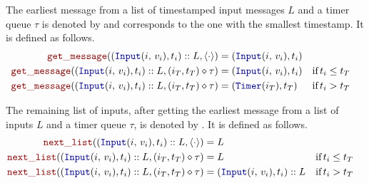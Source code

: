 \begin{definition}
    \label{def:semantics:grfrp:theorems:productivity:observe:aux:getMess}
    The earliest message from a list of timestamped input messages $L$ and a timer queue $\tau$ is
    denoted by  and corresponds to the one with the smallest timestamp. It is
    defined as follows.
    \begin{align}
        \getMess{(\inputMess{i}{v_i}, t_i) :: L}{\emptytimer}              & = (\inputMess{i}{v_i}, t_i)
        \label{eq:semantics:grfrp:theorems:productivity:observe:aux:getMess:empty}                                                     \\
        \getMess{(\inputMess{i}{v_i}, t_i) :: L}{(i_T, t_T) \diamond \tau} & = (\inputMess{i}{v_i}, t_i) &  & \text{if} \, t_i \le t_T
        \label{eq:semantics:grfrp:theorems:productivity:observe:aux:getMess:input}                                                     \\
        \getMess{(\inputMess{i}{v_i}, t_i) :: L}{(i_T, t_T) \diamond \tau} & = (\timerMess{i_T}, t_T)    &  & \text{if} \, t_i > t_T
        \label{eq:semantics:grfrp:theorems:productivity:observe:aux:getMess:timer}
    \end{align}
\end{definition}

\begin{definition}
    \label{def:semantics:grfrp:theorems:productivity:observe:aux:nextList}
    The remaining list of inputs, after getting the earliest message from a list of inputs $L$ and a
    timer queue $\tau$, is denoted by . It is defined as follows.
    \begin{align}
        \nextList{(\inputMess{i}{v_i}, t_i) :: L}{\emptytimer}              & = L
        \label{eq:semantics:grfrp:theorems:productivity:observe:aux:nextList:empty}                                                          \\
        \nextList{(\inputMess{i}{v_i}, t_i) :: L}{(i_T, t_T) \diamond \tau} & = L                              &  & \text{if} \, t_i \le t_T
        \label{eq:semantics:grfrp:theorems:productivity:observe:aux:nextList:input}                                                          \\
        \nextList{(\inputMess{i}{v_i}, t_i) :: L}{(i_T, t_T) \diamond \tau} & = (\inputMess{i}{v_i}, t_i) :: L &  & \text{if} \, t_i > t_T
        \label{eq:semantics:grfrp:theorems:productivity:observe:aux:nextList:timer}
    \end{align}
\end{definition}


